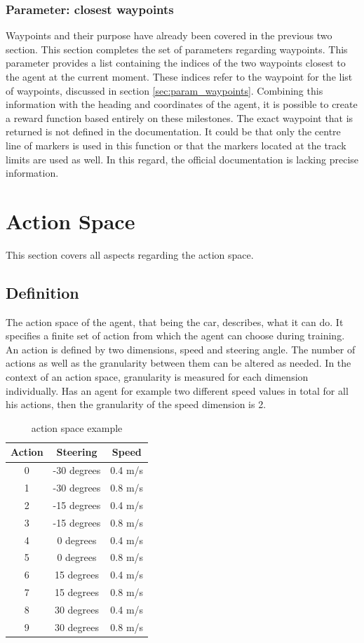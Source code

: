 \subsubsection{Parameter: closest waypoints}
Waypoints and their purpose have already been covered in the previous two section. This section completes the set of parameters regarding waypoints. This parameter provides a list containing the indices of the two waypoints closest to the agent at the current moment. These indices refer to the waypoint for the list of waypoints, discussed in section \ref{sec:param_waypoints}. Combining this information with the heading and coordinates of the agent, it is possible to create a reward function based entirely on these milestones. The exact waypoint that is returned is not defined in the documentation. It could be that only the centre line of markers is used in this function or that the markers located at the track limits are used as well. In this regard, the official documentation is lacking precise information.

\section{Action Space}
This section covers all aspects regarding the action space.
\subsection{Definition}
The action space of the agent, that being the car, describes, what it can do. It specifies a finite set of action from which the agent can choose during training. An action is defined by two dimensions, speed and steering angle. The number of actions as well as the granularity between them can be altered as needed. In the context of an action space, granularity is measured for each dimension individually. Has an agent for example two different speed values in total for all his actions, then the granularity of the speed dimension is 2.

\begin{table}
\centering
\begin{tabular}{||c c c||} 
 \hline
 \textbf{Action} & \textbf{Steering} & \textbf{Speed} \\ 
 \hline\hline
 0 & -30 degrees & 0.4 m/s \\ 
 1 & -30 degrees & 0.8 m/s \\
 2 & -15 degrees & 0.4 m/s \\
 3 & -15 degrees & 0.8 m/s \\
 4 & 0 degrees & 0.4 m/s \\ 
 5 & 0 degrees & 0.8 m/s \\
 6 & 15 degrees & 0.4 m/s \\
 7 & 15 degrees & 0.8 m/s \\
 8 & 30 degrees & 0.4 m/s \\
 9 & 30 degrees & 0.8 m/s \\
 \hline
\end{tabular}
\caption{action space example}
\label{table:action_space}
\end{table}


